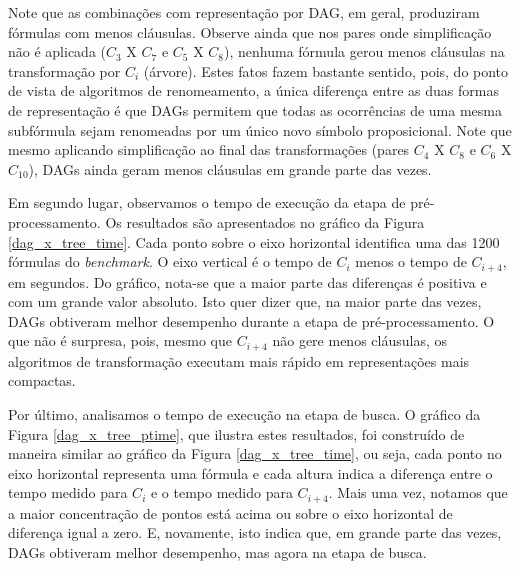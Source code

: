 
Note que as combinações com representação por DAG, em geral, produziram fórmulas com menos cláusulas. Observe ainda que nos pares onde simplificação não é aplicada ($C_3$ X $C_7$ e $C_5$ X $C_8$), nenhuma fórmula gerou menos cláusulas na transformação por $C_i$ (árvore). Estes fatos fazem bastante sentido, pois, do ponto de vista de algoritmos de renomeamento, a única diferença entre as duas formas de representação é que DAGs permitem que todas as ocorrências de uma mesma subfórmula sejam renomeadas por um único novo símbolo proposicional. Note que mesmo aplicando simplificação ao final das transformações (pares $C_4$ X $C_8$ e $C_6$ X $C_{10}$), DAGs ainda geram menos cláusulas em grande parte das vezes.

Em segundo lugar, observamos o tempo de execução da etapa de pré-processamento. Os resultados são apresentados no gráfico da Figura \ref{dag_x_tree_time}. Cada ponto sobre o eixo horizontal identifica uma das 1200 fórmulas do \textit{benchmark}. O eixo vertical é o tempo de $C_i$ menos o tempo de $C_{i+4}$, em segundos. Do gráfico, nota-se que a maior parte das diferenças é positiva e com um grande valor absoluto. Isto quer dizer que, na maior parte das vezes, DAGs obtiveram melhor desempenho durante a etapa de pré-processamento. O que não é surpresa, pois, mesmo que $C_{i+4}$ não gere menos cláusulas, os algoritmos de transformação executam mais rápido em representações mais compactas.


Por último, analisamos o tempo de execução na etapa de busca. O gráfico da Figura \ref{dag_x_tree_ptime}, que ilustra estes resultados, foi construído de maneira similar ao gráfico da Figura \ref{dag_x_tree_time}, ou seja, cada ponto no eixo horizontal representa uma fórmula e cada altura indica a diferença entre o tempo medido para $C_i$ e o tempo medido para $C_{i+4}$. Mais uma vez, notamos que a maior concentração de pontos está acima ou sobre o eixo horizontal de diferença igual a zero. E, novamente, isto indica que, em grande parte das vezes, DAGs obtiveram melhor desempenho, mas agora na etapa de busca.

